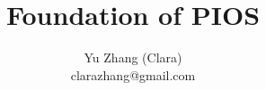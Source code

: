 \documentclass[pdftex]{article}
\begin{document}
\title{Foundation of PIOS}
\author{Yu Zhang (Clara)\\clarazhang@gmail.com}

\maketitle


%
%
%
%
\end{document}
